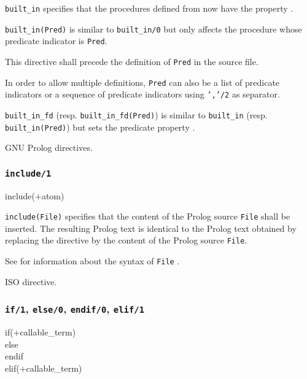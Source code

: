 \Description

\texttt{built\_in} specifies that the procedures defined from
now have the  property .

\texttt{built\_in(Pred)} is similar to \texttt{built\_in/0} but
only affects the procedure whose predicate indicator is \texttt{Pred}.

This directive shall precede the definition of \texttt{Pred} in the source
file.

In order to allow multiple definitions, \texttt{Pred} can also be a list of
predicate indicators or a sequence of predicate indicators using
\texttt{','/2} as separator.

\texttt{built\_in\_fd} (resp.
\texttt{built\_in\_fd(Pred)}) is similar to
\texttt{built\_in} (resp. \texttt{built\_in(Pred)}) but sets the
 predicate property .

\Portability

GNU Prolog directives.

\subsubsection{\texttt{include/1}}

\begin{TemplatesOneCol}
include(+atom)

\end{TemplatesOneCol}

\Description

\texttt{include(File)} specifies that the content of the Prolog source
\texttt{File} shall be inserted. The resulting Prolog text is identical to
the Prolog text obtained by replacing the directive by the content of the
Prolog source \texttt{File}.

See  for information about the syntax of
\texttt{File} .

\Portability

ISO directive.

\subsubsection{\texttt{if/1}, \texttt{else/0}, \texttt{endif/0}, \texttt{elif/1} }

\begin{TemplatesOneCol}
if(+callable\_term) \\
else\\
endif\\
elif(+callable\_term)

\end{TemplatesOneCol}

